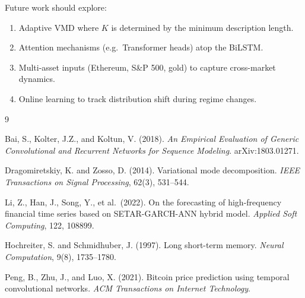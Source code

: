 \documentclass[12pt,a4paper]{article}
\begin{document}
Future work should explore:
\begin{enumerate}[label=(\roman*)]
  \item Adaptive VMD where $K$ is determined by the minimum description length.
  \item Attention mechanisms (e.g.\ Transformer heads) atop the BiLSTM.
  \item Multi-asset inputs (Ethereum, S\&P 500, gold) to capture cross-market
        dynamics.
  \item Online learning to track distribution shift during regime changes.
\end{enumerate}



\begin{thebibliography}{9}

  Bai, S., Kolter, J.Z., and Koltun, V. (2018).
  \textit{An Empirical Evaluation of Generic Convolutional and Recurrent Networks
  for Sequence Modeling}.
  arXiv:1803.01271.

  Dragomiretskiy, K. and Zosso, D. (2014).
  Variational mode decomposition.
  \textit{IEEE Transactions on Signal Processing}, 62(3), 531--544.

  Li, Z., Han, J., Song, Y., et al.\ (2022).
  On the forecasting of high-frequency financial time series based on
  SETAR-GARCH-ANN hybrid model.
  \textit{Applied Soft Computing}, 122, 108899.

  Hochreiter, S. and Schmidhuber, J. (1997).
  Long short-term memory.
  \textit{Neural Computation}, 9(8), 1735--1780.

  Peng, B., Zhu, J., and Luo, X. (2021).
  Bitcoin price prediction using temporal convolutional networks.
  \textit{ACM Transactions on Internet Technology}.

\end{thebibliography}
\end{document}
